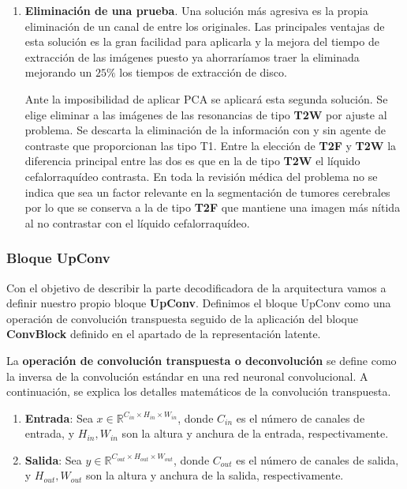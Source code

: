 \begin{enumerate}
	\item \textbf{Eliminación de una prueba}. Una solución más agresiva es la propia eliminación de un canal de entre los originales. Las principales ventajas de esta solución es la gran facilidad para aplicarla y la mejora del tiempo de extracción de las imágenes puesto ya ahorraríamos traer la eliminada mejorando un $25 \%$ los tiempos de extracción de disco. 
	
	Ante la imposibilidad de aplicar PCA se aplicará esta segunda solución. Se elige eliminar a las imágenes de las resonancias de tipo \textbf{T2W} por ajuste al problema. Se descarta la eliminación de la información con y sin agente de contraste que proporcionan las tipo T1. Entre la elección de \textbf{T2F} y \textbf{T2W} la diferencia principal entre las dos es que en la de tipo \textbf{T2W} el líquido cefalorraquídeo contrasta. En toda la revisión médica del problema no se indica que sea un factor relevante en la segmentación de tumores cerebrales por lo que se conserva a la de tipo \textbf{T2F} que mantiene una imagen más nítida al no contrastar con el líquido cefalorraquídeo.
	
\end{enumerate}

\subsubsection{Bloque UpConv}

Con el objetivo de describir la parte decodificadora de la arquitectura vamos a definir nuestro propio bloque \textbf{UpConv}. Definimos el bloque UpConv como una operación de convolución transpuesta seguido de la aplicación del bloque \textbf{ConvBlock} definido en el apartado de la representación latente.

La \textbf{operación de convolución transpuesta o deconvolución} se define como la inversa de la convolución estándar en una red neuronal convolucional. A continuación, se explica los detalles matemáticos de la convolución transpuesta.

\begin{enumerate}
	\item \textbf{Entrada}: Sea \( x \in \mathbb{R}^{C_{in} \times H_{in} \times W_{in}} \), donde \( C_{in} \) es el número de canales de entrada, y \( H_{in}, W_{in} \) son la altura y anchura de la entrada, respectivamente.
	
	\item \textbf{Salida}: Sea \( y \in \mathbb{R}^{C_{out} \times H_{out} \times W_{out}} \), donde \( C_{out} \) es el número de canales de salida, y \( H_{out}, W_{out} \) son la altura y anchura de la salida, respectivamente.
\end{enumerate}

